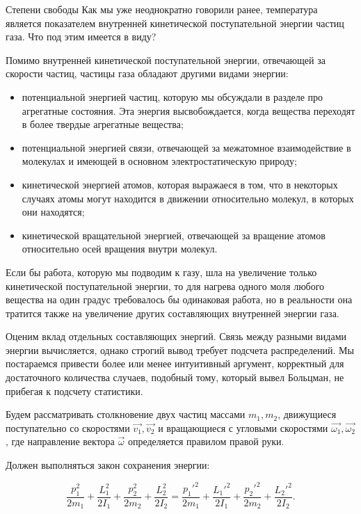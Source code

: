 \documentclass{article}
\begin{document}
	\begin{section}{Степени свободы}
		Как мы уже неоднократно говорили ранее, температура является показателем внутренней кинетической поступательной энергии частиц газа. Что под этим имеется в виду?

		Помимо внутренней кинетической поступательной энергии, отвечающей за скорости частиц, частицы газа обладают другими видами энергии:

		\begin{itemize}
			\item потенциальной энергией частиц, которую мы обсуждали в разделе про агрегатные состояния. Эта энергия высвобождается, когда вещества переходят в более твердые агрегатные вещества;
			\item потенциальной энергией связи, отвечающей за межатомное взаимодействие в молекулах и имеющей в основном электростатическую природу;
			\item кинетической энергией атомов, которая выражаеся в том, что в некоторых случаях атомы могут находится в движении относительно молекул, в которых они находятся;
			\item кинетической вращательной энергией, отвечающей за вращение атомов относительно осей вращения внутри молекул.
		\end{itemize}

		Если бы работа, которую мы подводим к газу, шла на увеличение только кинетической поступательной энергии, то для нагрева одного моля любого вещества на один градус требовалось бы одинаковая работа, но в реальности она тратится также на увеличение других составляющих внутренней энергии газа.

		Оценим вклад отдельных составляющих энергий. Связь между разными видами энергии вычисляется, однако строгий вывод требует подсчета распределений. Мы постараемся привести более или менее интуитивный аргумент, корректный для достаточного количества случаев, подобный тому, который вывел Больцман, не прибегая к подсчету статистики.

		Будем рассматривать столкновение двух частиц массами $m_1, m_2$, движущиеся поступательно со скоростями $\vec{v_1}, \vec{v_2}$ и вращающиеся с угловыми скоростями $\vec{\omega_1}, \vec{\omega_2}$, где направление вектора $\vec{\omega}$ определяется правилом правой руки.

		Должен выполняться закон сохранения энергии:

		\begin{equation*}
			\frac{p_1^2}{2m_1} + \frac{L_1^2}{2I_1} + \frac{p_2^2}{2m_2} + \frac{L_2^2}{2I_2} = \frac{p_1'^2}{2m_1} + \frac{L_1'^2}{2I_1} + \frac{p_2'^2}{2m_2} + \frac{L_2'^2}{2I_2}.
		\end{equation*}


\end{section}
\end{document}
